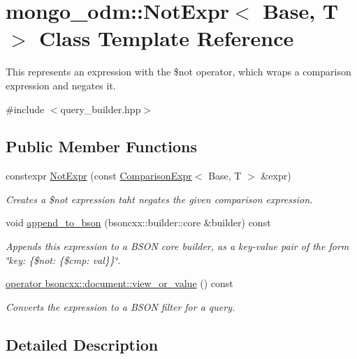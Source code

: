 \hypertarget{classmongo__odm_1_1NotExpr}{}\section{mongo\+\_\+odm\+:\+:Not\+Expr$<$ Base, T $>$ Class Template Reference}
\label{classmongo__odm_1_1NotExpr}


This represents an expression with the \$not operator, which wraps a comparison expression and negates it.  




{\ttfamily \#include $<$query\+\_\+builder.\+hpp$>$}

\subsection*{Public Member Functions}
\begin{DoxyCompactItemize}
\item 
constexpr \hyperlink{classmongo__odm_1_1NotExpr_a817dba48751e400a44e83c79ac57872f}{Not\+Expr} (const \hyperlink{classmongo__odm_1_1ComparisonExpr}{Comparison\+Expr}$<$ Base, T $>$ \&expr)
\begin{DoxyCompactList}\small\item\em Creates a \$not expression taht negates the given comparison expression. \end{DoxyCompactList}\item 
void \hyperlink{classmongo__odm_1_1NotExpr_aee3b9cef41a1fa5f4e60e141cefd1357}{append\+\_\+to\+\_\+bson} (bsoncxx\+::builder\+::core \&builder) const 
\begin{DoxyCompactList}\small\item\em Appends this expression to a B\+S\+ON core builder, as a key-\/value pair of the form \char`\"{}key\+: \{\$not\+: \{\$cmp\+: val\}\}\char`\"{}. \end{DoxyCompactList}\item 
\hyperlink{classmongo__odm_1_1NotExpr_a6f2e9d9b79c21dafbf30f05d231ee52c}{operator bsoncxx\+::document\+::view\+\_\+or\+\_\+value} () const 
\begin{DoxyCompactList}\small\item\em Converts the expression to a B\+S\+ON filter for a query. \end{DoxyCompactList}\end{DoxyCompactItemize}


\subsection{Detailed Description}
